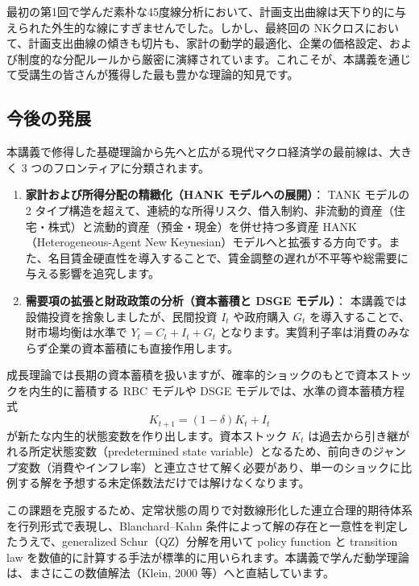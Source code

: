\documentclass[
  japanese,
  lualatex,
  ja=standard,
  12pt,
  a4paper]{ltjsarticle}
\providecommand{\tightlist}{%
  \setlength{\itemsep}{0pt}\setlength{\parskip}{0pt}}
\begin{document}
最初の第1回で学んだ素朴な45度線分析において、計画支出曲線は天下り的に与えられた外生的な線にすぎませんでした。しかし、最終回の
NKクロスにおいて、計画支出曲線の傾きも切片も、家計の動学的最適化、企業の価格設定、および制度的な分配ルールから厳密に演繹されています。これこそが、本講義を通じて受講生の皆さんが獲得した最も豊かな理論的知見です。

\subsection{今後の発展}\label{ux4ecaux5f8cux306eux767aux5c55}

本講義で修得した基礎理論から先へと広がる現代マクロ経済学の最前線は、大きく
3 つのフロンティアに分類されます。

\begin{enumerate}
\def\labelenumi{\arabic{enumi}.}
\tightlist
\item
  \textbf{家計および所得分配の精緻化（HANK モデルへの展開）}： TANK
  モデルの 2
  タイプ構造を超えて、連続的な所得リスク、借入制約、非流動的資産（住宅・株式）と流動的資産（預金・現金）を併せ持つ多資産
  HANK（Heterogeneous-Agent New
  Keynesian）モデルへと拡張する方向です。また、名目賃金硬直性を導入することで、賃金調整の遅れが不平等や総需要に与える影響を追究します。
\item
  \textbf{需要項の拡張と財政政策の分析（資本蓄積と DSGE モデル）}：
  本講義では設備投資を捨象しましたが、民間投資 \(I_t\) や政府購入
  \(G_t\) を導入することで、財市場均衡は水準で \(Y_t = C_t + I_t + G_t\)
  となります。実質利子率は消費のみならず企業の資本蓄積にも直接作用します。
\end{enumerate}


\begin{tcolorbox}[enhanced jigsaw, arc=.35mm, bottomrule=.15mm, bottomtitle=1mm, breakable, colback=white, colbacktitle=quarto-callout-note-color!10!white, colframe=quarto-callout-note-color-frame, coltitle=black, left=2mm, leftrule=.75mm, opacityback=0, opacitybacktitle=0.6, rightrule=.15mm, title=\textcolor{quarto-callout-note-color}{\faInfo}\hspace{0.5em}{資本を含むRBCモデルとDSGEの数値解法}, titlerule=0mm, toprule=.15mm, toptitle=1mm]

成長理論では長期の資本蓄積を扱いますが、確率的ショックのもとで資本ストックを内生的に蓄積する
RBC モデルや DSGE モデルでは、水準の資本蓄積方程式 \[
K_{t+1} = (1-\delta)K_t + I_t
\] が新たな内生的状態変数を作り出します。資本ストック \(K_t\)
は過去から引き継がれる所定状態変数（predetermined state
variable）となるため、前向きのジャンプ変数（消費やインフレ率）と連立させて解く必要があり、単一のショックに比例する解を予想する未定係数法だけでは解けなくなります。

この課題を克服するため、定常状態の周りで対数線形化した連立合理的期待体系を行列形式で表現し、Blanchard--Kahn
条件によって解の存在と一意性を判定したうえで、generalized
Schur（QZ）分解を用いて policy function と transition law
を数値的に計算する手法が標準的に用いられます。本講義で学んだ動学理論は、まさにこの数値解法（Klein,
2000 等）へと直結しています。

\end{tcolorbox}
\end{document}

